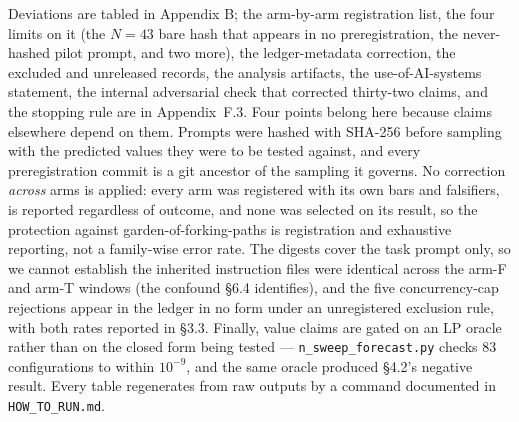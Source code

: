Deviations are tabled in Appendix B; the arm-by-arm registration list, the four limits on it (the
$N = 43$ bare hash that appears in no preregistration, the never-hashed pilot prompt, and two
more), the ledger-metadata correction, the excluded and unreleased records, the analysis artifacts,
the use-of-AI-systems statement, the internal adversarial check that corrected thirty-two claims,
and the stopping rule are in Appendix~F.3. Four points belong here because claims elsewhere depend
on them. Prompts were hashed with SHA-256 before sampling with the predicted values they were to be
tested against, and every preregistration commit is a git ancestor of the sampling it governs. No
correction \emph{across} arms is applied: every arm was registered with its own bars and falsifiers,
is reported regardless of outcome, and none was selected on its result, so the protection against
garden-of-forking-paths is registration and exhaustive reporting, not a family-wise error rate. The
digests cover the task prompt only, so we cannot establish the inherited instruction files were
identical across the arm-F and arm-T windows (the confound \S6.4 identifies), and the five
concurrency-cap rejections appear in the ledger in no form under an unregistered exclusion rule,
with both rates reported in \S3.3. Finally, value claims are gated on an LP oracle rather than on
the closed form being tested --- \texttt{n\_sweep\_forecast.py} checks 83 configurations to within
$10^{-9}$, and the same oracle produced \S4.2's negative result. Every table regenerates from raw
outputs by a command documented in \texttt{HOW\_TO\_RUN.md}.
